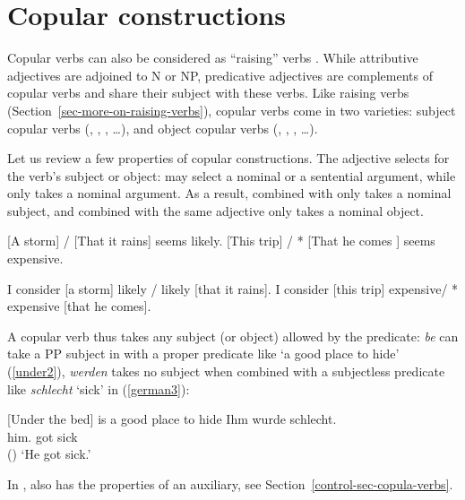 \section{Copular constructions}
\label{sec-copular-constructions}

Copular verbs can also be considered as ``raising'' verbs \citep[]{Chomsky81a}.  While
attributive adjectives are adjoined to N or NP, predicative adjectives are complements of copular
verbs and share their subject with these verbs. Like raising verbs
(Section~\ref{sec-more-on-raising-verbs}), copular verbs come in two varieties: subject copular
verbs (, , , \ldots), and object copular verbs (,
, , \ldots).

Let us review a few properties of copular constructions.
The adjective selects for the verb's subject or object:  may select a nominal or a
sentential argument, while  only takes a nominal argument. As a result, 
combined with  only takes a nominal subject, and  combined with the
same adjective only takes a nominal object. 


\begin{exe}
\ex \label{storm}
\begin{xlist}
\ex{} [A storm] / [That it rains] seems likely.
\ex{} [This trip] / * [That he comes ] seems expensive.
\end{xlist}
\ex \begin{xlist}
\ex 	I consider [a storm] likely / likely [that it rains].
\ex 	I consider [this trip] expensive/ * expensive [that he comes].
\end{xlist}	
\end{exe}


A copular verb thus takes any subject (or object) allowed by the predicate: \emph{be} can take a PP
subject in  with a proper predicate like `a good place to hide' (\ref{under2}), \emph{werden} takes no subject when combined with a
subjectless predicate like \emph{schlecht} `sick' in  (\ref{german3}):

\eal
\ex{}[Under the bed] is a good place to hide \label{under2}
\ex
\label{german3} 
\gll Ihm        wurde schlecht.\footnotemark\\
     him.\DAT{} got   sick\\\hfill()
\glt `He got sick.'
\zl

\noindent
In ,  also has the properties of an auxiliary, see Section~\ref{control-sec-copula-verbs}.

